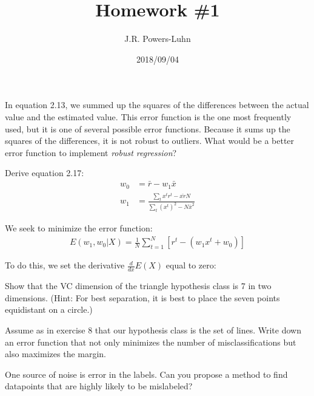 \documentclass{hw}
\author{J.R. Powers-Luhn}
\date{2018/09/04}
\title{Homework \#1}
\newcommand{\mean}{\bar}
\begin{document}

    In equation 2.13, we summed up the squares of the differences between the actual value and the estimated value. This error function is the one most frequently used, but it is one of several possible error functions. Because it sums up the squares of the differences, it is not robust to outliers. What would be a better error function to implement \textit{robust regression}?

\solution
    

    Derive equation 2.17: 
    \begin{align*}
        w_0 &= \mean{r} - w_1 \mean{x} \\
        w_1 &= \frac{\sum_t x^t r^t - \mean{x r} N}{\sum_t \left( x^t \right)^2 - N \mean{x}^2}
    \end{align*}

\solution
    We seek to minimize the error function:
    \begin{align*}
        E(w_1, w_0 | X) = \frac{1}{N} \sum_{t=1}^N \left[ r^t - \left( w_1 x^t + w_0 \right) \right]
    \end{align*}

    To do this, we set the derivative $\frac{d}{dx} E(X)$ equal to zero:

    Show that the VC dimension of the triangle hypothesis class is 7 in two dimensions.  (Hint: For best separation, it is best to place the seven points equidistant on a circle.)

\solution
    

    Assume as in exercise 8 that our hypothesis class is the set of lines. Write down an error function that not only minimizes the number of misclassifications but also maximizes the margin.

\solution
    

    One source of noise is error in the labels. Can you propose a method to find datapoints that are highly likely to be mislabeled?

\solution
    
\end{document}

